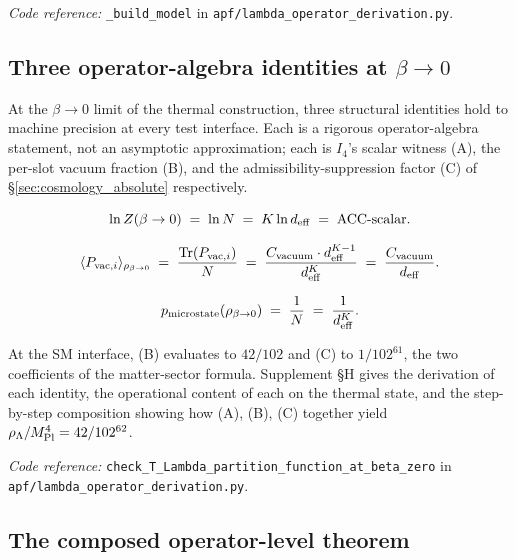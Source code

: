 \documentclass[11pt]{article}
\newcommand{\coderef}[2]{\smallskip\noindent\textit{Code reference:} \texttt{#1} in \texttt{#2}.}
\newcommand{\Mpl}{M_{\rm Pl}}
\begin{document}
\coderef{\_build\_model}{apf/lambda\_operator\_derivation.py}

\subsection{Three operator-algebra identities at $\beta \to 0$}\label{sec:operator_identities}

At the $\beta \to 0$ limit of the thermal construction, three structural identities hold to machine precision at every test interface.  Each is a rigorous operator-algebra statement, not an asymptotic approximation; each is $I_4$'s scalar witness (A), the per-slot vacuum fraction (B), and the admissibility-suppression factor (C) of \S\ref{sec:cosmology_absolute} respectively.

\begin{tcolorbox}[apfbox, title={Identity (A) --- Partition-function limit}]
\[
\ln Z(\beta \to 0) \;=\; \ln N \;=\; K \ln d_{\rm eff} \;=\; \mathrm{ACC}\text{-scalar}.
\]
\end{tcolorbox}

\begin{tcolorbox}[apfbox, title={Identity (B) --- Vacuum-projector expectation}]
\[
\langle P_{{\rm vac},i} \rangle_{\rho_{\beta \to 0}} \;=\; \frac{\mathrm{Tr}(P_{{\rm vac},i})}{N} \;=\; \frac{C_{\rm vacuum} \cdot d_{\rm eff}^{K-1}}{d_{\rm eff}^K} \;=\; \frac{C_{\rm vacuum}}{d_{\rm eff}}.
\]
\end{tcolorbox}

\begin{tcolorbox}[apfbox, title={Identity (C) --- Per-microstate probability}]
\[
p_{\rm microstate}(\rho_{\beta \to 0}) \;=\; \frac{1}{N} \;=\; \frac{1}{d_{\rm eff}^K}.
\]
\end{tcolorbox}

At the SM interface, (B) evaluates to $42/102$ and (C) to $1/102^{61}$, the two coefficients of the matter-sector formula.  Supplement \S H gives the derivation of each identity, the operational content of each on the thermal state, and the step-by-step composition showing how (A), (B), (C) together yield $\rho_\Lambda/\Mpl^4 = 42/102^{62}$.

\coderef{check\_T\_Lambda\_partition\_function\_at\_beta\_zero}{apf/lambda\_operator\_derivation.py}

\subsection{The composed operator-level theorem}\label{sec:operator_composed_theorem}
\end{document}
